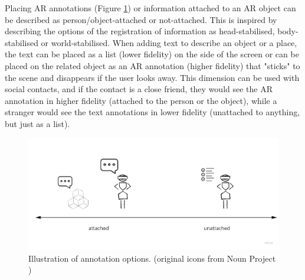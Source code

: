 Placing AR annotations (Figure \ref{fig:continuum:data-annotation}) or information attached to an AR object can be described as person/object-attached or not-attached. 
This is inspired by \textcite{Billinghurst1998} describing the options of the registration of information as head-stabilised, body-stabilised or world-stabilised. 
When adding text to describe an object or a place, the text can be placed as a list (lower fidelity) on the side of the screen or can be placed on the related object as an AR annotation (higher fidelity) that "sticks" to the scene and disappears if the user looks away. 
This dimension can be used with social contacts, and if the contact is a close friend, they would see the AR annotation in higher fidelity (attached to the person or the object), while a stranger would see the text annotations in lower fidelity (unattached to anything, but just as a list). 


\begin{figure}[ht]
    \centering
    \includegraphics[width=0.8\linewidth]{images/30-continuum/continuum-annotation-2.jpg}
    \caption{Illustration of annotation options. (original icons from Noun Project \cite{TheNounProjectInc.})}
    \label{fig:continuum:data-annotation}
\end{figure}




